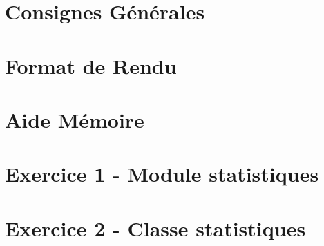 \documentclass[12pt,a4paper]{article}
\begin{document}
\maketitle





\newpage

\tableofcontents

\newpage

\section{Consignes Générales}

\bigskip



\newpage

\section{Format de Rendu}
\label{sec:FormatDeRendu}

\vspace*{1cm}



\newpage

\section{Aide Mémoire}
\label{sec:AideMemoire}

\vspace*{1cm}



\newpage


%
%
%
%


\section{Exercice 1 - Module statistiques}

\vspace*{0.7cm}



\newpage

\section{Exercice 2 - Classe statistiques}

\vspace*{0.7cm}


\end{document}
